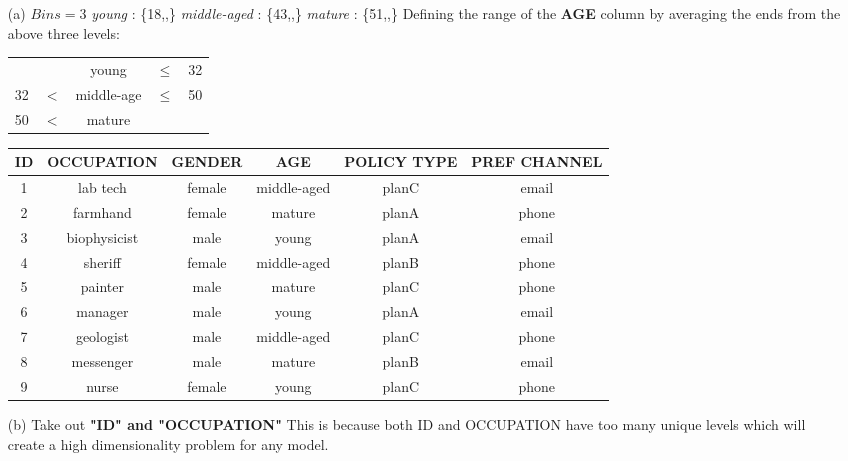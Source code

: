 \documentclass[10pt,a4paper]{article}
\begin{document}
	\begin{enumerate}
		\item[(a)] $Bins = 3$ \newline
			\textit{young} : \{18,,\} \hspace{1cm} \textit{middle-aged} : \{43,,\} \hspace{1cm} \textit{mature} : \{51,,\} \newline
			Defining the range of the \textbf{AGE} column by averaging the ends from the above three levels:
			\begin{table}[h]
				\begin{tabular}{ccccc}
					& & young & $\leq$ & 32 \\
					32 & $<$ & middle-age & $\leq$ & 50 \\
					50 & $<$ & mature & &
				\end{tabular}
			\end{table}
			\begin{table}[h!]
				\begin{tabular}{cccccc}
					\toprule
					\textbf{ID} & \textbf{OCCUPATION} & \textbf{GENDER} & \textbf{AGE} & \textbf{POLICY TYPE} & \textbf{PREF CHANNEL} \\ \midrule
					1 & lab tech & female & middle-aged & planC & email \\
					2 & farmhand & female & mature & planA & phone \\
					3 & biophysicist & male & young & planA & email \\ 
					4 & sheriff & female & middle-aged & planB & phone \\
					5 & painter & male & mature & planC & phone \\
					6 & manager & male & young & planA & email \\
					7 & geologist & male & middle-aged & planC & phone \\
					8 & messenger & male & mature & planB & email \\
					9 & nurse & female & young & planC & phone \\ \bottomrule 
				\end{tabular}
			\end{table}
		
		\item[(b)] Take out \textbf{"ID" and "OCCUPATION"} \newline
			This is because both ID and OCCUPATION have too many unique levels which will create a high dimensionality problem for any model.
		

\end{enumerate}
\end{document}
